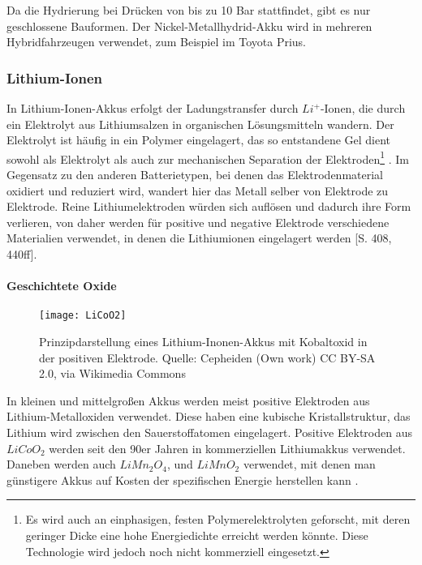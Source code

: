 Da die Hydrierung bei Drücken von bis zu 10 Bar stattfindet, gibt es nur geschlossene Bauformen. Der Nickel-Metallhydrid-Akku wird in mehreren Hybridfahrzeugen verwendet, zum Beispiel im Toyota Prius.

\subsubsection{Lithium-Ionen}
In Lithium-Ionen-Akkus erfolgt der Ladungstransfer durch $Li^+$-Ionen, die durch ein Elektrolyt aus Lithiumsalzen in organischen Lösungsmitteln wandern. Der Elektrolyt ist häufig in ein Polymer eingelagert, das so entstandene Gel dient sowohl als Elektrolyt als auch zur mechanischen Separation der Elektroden\footnote{Es wird auch an einphasigen, festen Polymerelektrolyten geforscht, mit deren geringer Dicke eine hohe Energiedichte erreicht werden könnte. Diese Technologie wird jedoch noch nicht kommerziell eingesetzt.} \cite{xu2004nonaqueous}. Im Gegensatz zu den anderen Batterietypen, bei denen das Elektrodenmaterial oxidiert und reduziert wird, wandert hier das Metall selber von Elektrode zu Elektrode. Reine Lithiumelektroden würden sich auflösen und dadurch ihre Form verlieren, von daher werden für positive und negative Elektrode verschiedene Materialien verwendet, in denen die Lithiumionen eingelagert werden \cite{KiehneBattery}[S. 408, 440ff].

\paragraph{Geschichtete Oxide}

\begin{figure}\centering
	 \texttt{[image: LiCoO2]}
	 \caption{Prinzipdarstellung eines Lithium-Inonen-Akkus mit Kobaltoxid in der positiven Elektrode. Quelle: Cepheiden (Own work) CC BY-SA 2.0, via Wikimedia Commons}
	 \label{abb_LiCoO2}
\end{figure}

In kleinen und mittelgroßen Akkus werden meist positive Elektroden aus Lithium-Metalloxiden verwendet. Diese haben eine kubische Kristallstruktur, das Lithium wird zwischen den Sauerstoffatomen eingelagert. Positive Elektroden aus $LiCoO_2$ werden seit den 90er Jahren in kommerziellen Lithiumakkus verwendet. Daneben werden auch $LiMn_2O_4$, und $LiMnO_2$ verwendet, mit denen man günstigere Akkus auf Kosten der spezifischen Energie herstellen kann \cite{whittingham2004lithium}. %

